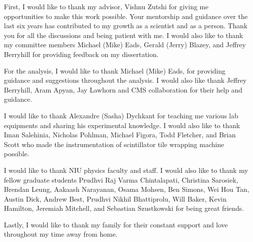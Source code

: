 First, I would like to thank my advisor, Vishnu Zutshi
for giving me opportunities to make this work possible.
Your mentorship and guidance over the last six years has
contributed to my growth as a scientist and as a person. Thank you
for all the discussions and being patient with me.
I would also like to thank my committee members Michael (Mike) Eads,
Gerald (Jerry) Blazey, and Jeffrey Berryhill for providing feedback
on my dissertation.

For the analysis, I would like to thank Michael (Mike) Eads, for providing
guidance and suggestions throughout the analysis.
I would also like thank Jeffrey Berryhill, Aram Apyan, Jay Lawhorn
and CMS collaboration for their help and guidance.


I would like to thank Alexandre (Sasha) Dychkant for
teaching me various lab equipments and sharing his experimental knowledge.
I would also like to thank
Iman Salehinia, Nicholas Pohlman, Michael Figora, Todd Fletcher,
and Brian Scott who made the instrumentation of
scintillator tile wrapping machine possible.

I would like to thank NIU physics faculty and staff. I would also
like to thank my fellow graduate students
Prudhvi Raj Varma Chintalapati,
Christina Sarosiek,
Brendan Leung,
Aakaash Narayanan,
Osama Mohsen,
Ben Simons,
Wei Hou Tan,
Austin Dick,
Andrew Best,
Prudhvi Nikhil Bhattiprolu,
Will Baker,
Kevin Hamilton,
Jeremiah Mitchell,
and Sebastian Szustkowski
for being great friends.


Lastly, I would like to thank my family for their constant
support and love throughout my time away from home.